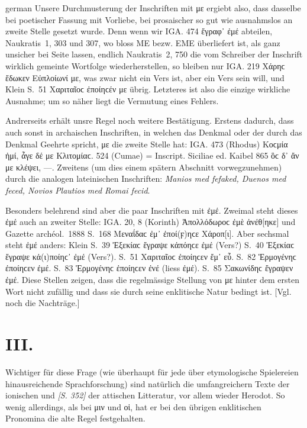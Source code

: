 \begin{otherlanguage*}{german}
Unsere Durchmusterung der Inschriften mit με ergiebt also, dass dasselbe bei poetischer Fassung mit Vorliebe, bei prosaischer so gut wie ausnahmslos an zweite Stelle gesetzt wurde. Denn wenn wir IGA. 474 ἔγραφ᾽ ἐμέ abteilen, Naukratis~1, 303 und 307, wo bloss ΜΕ bezw. ΕΜΕ überliefert ist, als ganz unsicher bei Seite lassen, endlich Naukratis~2, 750 die vom Schreiber der Inschrift wirklich gemeinte Wortfolge wiederherstellen, so bleiben nur IGA. 219 Χάρηϲ ἔδωκεν Εὐπλοίωνί με, was zwar nicht ein Vers ist, aber ein Vers sein will, und Klein S.~51 Χαριταῖοϲ ἐποίηϲέν με übrig. Letzteres ist also die einzige wirkliche Ausnahme; um so näher liegt die Vermutung eines Fehlers.

Andrerseits erhält unsre Regel noch weitere Bestätigung. Erstens dadurch, dass auch sonst in archaischen Inschriften, in welchen das Denkmal oder der durch das Denkmal Geehrte spricht, με die zweite Stelle hat: IGA. 473 (Rhodus) Κοϲμία ἠμί, ἆγε δέ με Κλιτομίαϲ. 524 (Cumae) = Inscript. Siciliae ed. Kaibel 865 ὃϲ δ᾽ ἄν με κλέψει, —. Zweitens (um dies einem spätern Abschnitt vorwegzunehmen) durch die analogen lateinischen Inschriften: \emph{Manios med fefaked, Duenos med feced, Novios Plautios med Romai fecid}.

Besonders belehrend sind aber die paar Inschriften mit ἐμέ. Zweimal steht dieses ἐμέ auch an zweiter Stelle: IGA. 20, 8 (Korinth) Ἀπολλόδωροϲ ἐμὲ ἀνέθ[ηκε] und Gazette archéol.~1888 S.~168 Μεναΐδαϲ ἐμ᾽ ἐποί(ϝ)ηϲε Χάροπ[ι]. Aber sechsmal steht ἐμέ anders: Klein S.~39 Ἐξεκίαϲ ἔγραψε κἀπόηϲε ἐμέ (Vers?) S.~40 Ἐξεκίαϲ ἔγραψε κἀ(ι)ποίηϲ᾽ ἐμέ (Vers?). S.~51 Χαριταῖοϲ ἐποίηϲεν ἔμ᾽ εὖ. S.~82 Ἑρμογένηϲ ἐποίηϲεν ἐμέ. S.~83 Ἑρμογένηϲ ἐποίηϲεν ἐνέ (liess ἐμέ). S.~85 Σακω\-νίδηϲ ἔγραψεν ἐμέ. Diese Stellen zeigen, dass die regelmässige Stellung von με hinter dem ersten Wort nicht zufällig und dass sie durch seine enklitische Natur bedingt ist. [Vgl. noch die Nachträge.]

\section*{III.}

Wichtiger für diese Frage (wie überhaupt für jede über etymologische Spielereien hinausreichende Sprachforschung) sind natürlich die umfangreichern Texte der ionischen und \hypertarget{p352}{\emph{[S. 352]}}\label{p352} der attischen Litteratur, vor allem wieder Herodot. So wenig allerdings, als bei μιν und οἱ, hat er bei den übrigen enklitischen Pronomina die alte Regel festgehalten.


\end{otherlanguage*}
